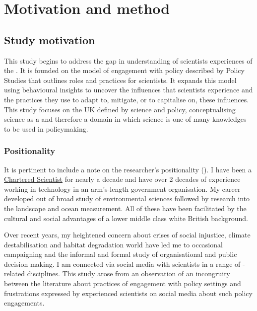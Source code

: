 \chapter{Motivation and method}\label{ch:methods}

\section{Study motivation}\label{sec:metmotivation}

This study begins to address the gap in understanding of scientists experiences of the \SPI. It is founded on the model of engagement with policy described by Policy Studies that outlines roles and practices for scientists. It expands this model using behavioural insights to uncover the influences that scientists experience and the practices they use to adapt to, mitigate, or to capitalise on, these influences. This study focuses on the UK \SPI{} defined by \CAN{} science and policy, conceptualising \CAN{} science as a \PNS{} and therefore a domain in which science is one of many knowledges to be used in policymaking. 

\subsection{Positionality}\label{sec:metpositionality}

It is pertinent to include a note on the researcher's positionality (\cite{CreswellP2017}). I have been a \href{https://sciencecouncil.org/scientists-science-technicians/which-professional-award-is-right-for-me/csci/}{Chartered Scientist} for nearly a decade and have over 2 decades of experience working in technology in an arm's-length government organisation. My career developed out of broad study of environmental sciences followed by research into the landscape and ocean measurement. All of these have been facilitated by the cultural and social advantages of a lower middle class white British background.

Over recent years, my heightened concern about crises of social injustice, climate destabilisation and habitat degradation world have led me to occasional campaigning and the informal and formal study of organisational and public decision making. I am connected via social media with scientists in a range of \CAN-related disciplines. This study arose from an observation of an incongruity between the literature about practices of engagement with policy settings and frustrations expressed by experienced scientists on social media about such policy engagements.

